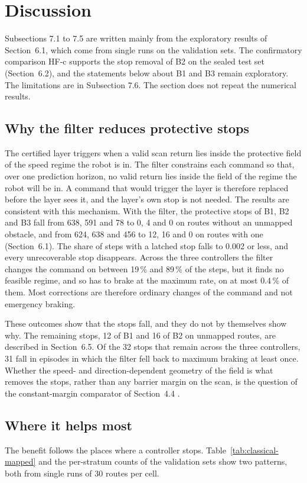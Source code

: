 \section{Discussion}

Subsections 7.1 to 7.5 are written mainly from the exploratory results of Section~6.1, which come from single runs on the validation sets. The confirmatory comparison HF-c supports the stop removal of B2 on the sealed test set (Section~6.2), and the statements below about B1 and B3 remain exploratory. The limitations are in Subsection 7.6. The section does not repeat the numerical results.

\subsection{Why the filter reduces protective stops}
The certified layer triggers when a valid scan return lies inside the protective field of the speed regime the robot is in. The filter constrains each command so that, over one prediction horizon, no valid return lies inside the field of the regime the robot will be in. A command that would trigger the layer is therefore replaced before the layer sees it, and the layer's own stop is not needed. The results are consistent with this mechanism. With the filter, the protective stops of B1, B2 and B3 fall from 638, 591 and 78 to 0, 4 and 0 on routes without an unmapped obstacle, and from 624, 638 and 456 to 12, 16 and 0 on routes with one (Section~6.1). The share of steps with a latched stop falls to 0.002 or less, and every unrecoverable stop disappears. Across the three controllers the filter changes the command on between 19\,\% and 89\,\% of the steps, but it finds no feasible regime, and so has to brake at the maximum rate, on at most 0.4\,\% of them. Most corrections are therefore ordinary changes of the command and not emergency braking.

These outcomes show that the stops fall, and they do not by themselves show why. The remaining stops, 12 of B1 and 16 of B2 on unmapped routes, are described in Section~6.5. Of the 32 stops that remain across the three controllers, 31 fall in episodes in which the filter fell back to maximum braking at least once. Whether the speed- and direction-dependent geometry of the field is what removes the stops, rather than any barrier margin on the scan, is the question of the constant-margin comparator of Section~4.4 .

\subsection{Where it helps most}
The benefit follows the places where a controller stops. Table~\ref{tab:classical-mapped} and the per-stratum counts of the validation sets show two patterns, both from single runs of 30 routes per cell.

